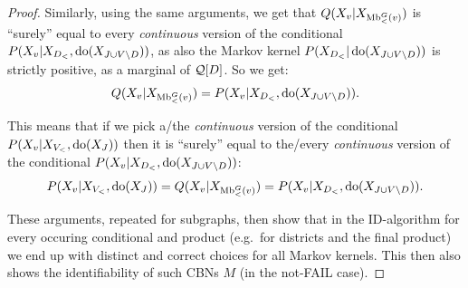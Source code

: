 \begin{Thm}
\begin{proof}
     Similarly, using the same arguments, we get that $Q(X_v|X_{\mathrm{Mb}^G_<(v)})$ is ``surely'' equal to every \emph{continuous} version 
     of the conditional
     $P(X_v|X_{D_<},\operatorname{do}(X_{J \cup V\setminus D}))$, as also the Markov kernel $P(X_{D_<}|\operatorname{do}(X_{J \cup V\setminus D}))$ is strictly positive,
     as a marginal of $\mathcal{Q}[D]$. So we get:
     \[ Q(X_v|X_{\mathrm{Mb}^G_<(v)}) = P(X_v|X_{D_<},\operatorname{do}(X_{J \cup V\setminus D})).  \]

     This means that if we pick a/the \emph{continuous} version of the conditional $P(X_v|X_{V_<},\operatorname{do}(X_J))$ 
     then it is ``surely'' equal to
     the/every \emph{continuous} version of the conditional $P(X_v|X_{D_<},\operatorname{do}(X_{J \cup V\setminus D}))$:
      \[ P(X_v|X_{V_<},\operatorname{do}(X_J))=Q(X_v|X_{\mathrm{Mb}^G_<(v)}) = P(X_v|X_{D_<},\operatorname{do}(X_{J \cup V\setminus D})).  \]

     These arguments, repeated for subgraphs, then show that in the ID-algorithm for every occuring conditional and product
     (e.g.\ for districts and the final product) we end up with 
     distinct and correct choices for all Markov kernels. This then also shows the identifiability of such CBNs $M$
     (in the not-FAIL case).
    \end{proof}
\end{Thm}


